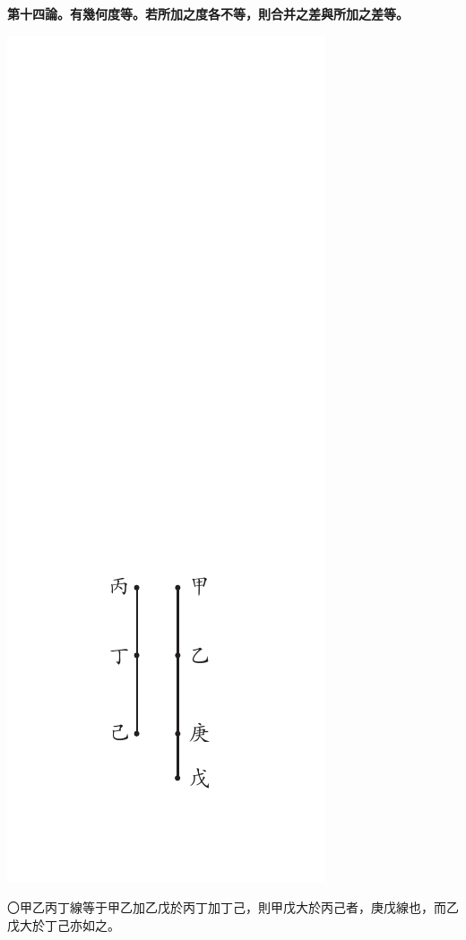 \documentclass[12pt,b5paper,landscape]{article}
\newcommand{\bcom}[1]{〇#1}
\newcommand{\cthm}[1]{{
\vspace{8pt}

\bfseries #1}}
\begin{document}
\begin{multicols}{2}
\cthm{第十四論。有幾何度等。若所加之度各不等，則合并之差與所加之差等。}
\begin{center}
\includegraphics[angle=90]{eu32}
\end{center}
\bcom{甲乙丙丁線等于甲乙加乙戊於丙丁加丁己，則甲戊大於丙己者，庚戊線也，而乙戊大於丁己亦如之。}


\end{multicols}
\end{document}
